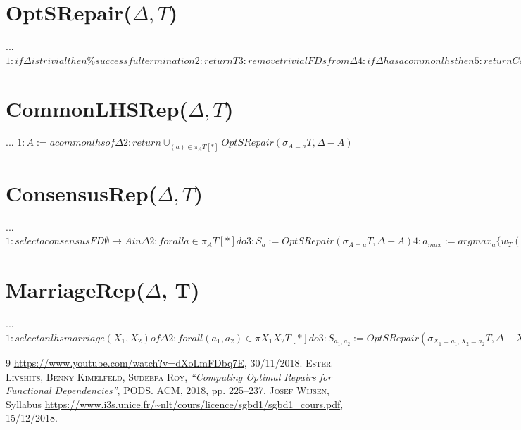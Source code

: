 \documentclass[12pt, a4paper, oneside, titlepage]{book}%
\begin{document}
\clearpage
\section{OptSRepair($\Delta, T$)}
...
$
1: if \Delta is trivial then \% successful termination
2: return T
3: remove trivial FDs from \Delta
4: if \Delta has a common lhs then
5: return CommonLHSRep(\Delta,T )
6: if \Delta has a consensus FD then
7: return ConsensusRep(\Delta,T )
8: if \Delta has an lhs marriage then
9: return MarriageRep(\Delta,T )
10: fail \% cannot find an optimal S-repair
$

\section{CommonLHSRep($\Delta, T$)}
...
$
1: A := a common lhs of \Delta
2: return \cup_{(a)\in \pi_{A}T[*]}OptSRepair(\sigma_{A=a}T, \Delta - A)
$

\section{ConsensusRep($\Delta, T$)}
...
$
1: select a consensus FD \emptyset \rightarrow  A in \Delta
2: for all a \in \pi_A T [*] do
3: S_a := OptSRepair(\sigma_{A=a}T, \Delta - A)
4: a_{max} := argmax_a \{w_T (S_a ) | (a) \in  \sigma_A T [*]\}
5: return S_{a_{max}}
$

\section{MarriageRep($\Delta$, T)}
...
$
1: select an lhs marriage (X_1, X_2) of \Delta
2: for all (a_1, a_2) \in  \pi{X_1 X_2} T [*] do
3: S_{a_1, a_2} := OptSRepair(\sigma_{X_1 = a_1, X_2 = a_2}T, \Delta - X_1 X_2)
4: w(a_1, a_2) := w_T (S_{a_1,a_2} )
5: V_i := \pi_{X_i}T [*] for i = 1, 2
6: E := \{(a_1, a_2) | (a_1, a_2) \in  \pi_{X_1 X_2}T [*]\}
7: G := weighted bipartite graph (V_1,V_2, E,w)
8: E_{max} := a maximum matching of G
9: return \cup_{(a_1, a_2 )\in E_{max}}S_{a_1, a_2}
$











\clearpage
\appendix

\begin{thebibliography}{9}
 \url{https://www.youtube.com/watch?v=dXoLmFDbq7E}, 30/11/2018.
 \textsc{Ester Livshits, Benny Kimelfeld, Sudeepa Roy}, \textit{ “Computing Optimal Repairs for Functional Dependencies”}, PODS. ACM, 2018, pp. 225–237.
 \textsc{Josef Wijsen}, {Syllabus}
 \url{https://www.i3s.unice.fr/~nlt/cours/licence/sgbd1/sgbd1_cours.pdf}, 15/12/2018.
\end{thebibliography}

\end{document}
